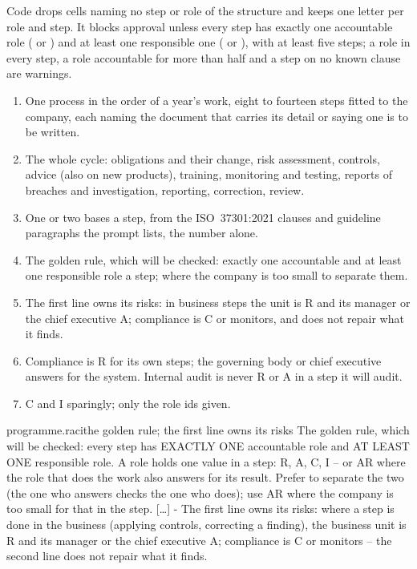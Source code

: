 Code drops cells naming no step or role of the structure and keeps one letter per role and
step. It blocks approval unless every step has exactly one accountable role ( or
) and at least one responsible one ( or ), with at least five
steps; a role in every step, a role accountable for more than half and a step on no known
clause are warnings.

\begin{enumerate}[itemsep=1pt, topsep=3pt]
  \item One process in the order of a year's work, eight to fourteen steps fitted to the
    company, each naming the document that carries its detail or saying one is to be written.
  \item The whole cycle: obligations and their change, risk assessment, controls, advice
    (also on new products), training, monitoring and testing, reports of breaches and
    investigation, reporting, correction, review.
  \item One or two bases a step, from the ISO~37301:2021 clauses and guideline paragraphs the
    prompt lists, the number alone.
  \item The golden rule, which will be checked: exactly one accountable and at least one
    responsible role a step;  where the company is too small to separate them.
  \item The first line owns its risks: in business steps the unit is R and its manager or the
    chief executive A; compliance is C or monitors, and does not repair what it finds.
  \item Compliance is R for its own steps; the governing body or chief executive answers for
    the system. Internal audit is never R or A in a step it will audit.
  \item C and I sparingly; only the role ids given.
\end{enumerate}

\par\nopagebreak
\begin{promptexcerpt}{programme.raci}{the golden rule; the first line owns its risks}
The golden rule, which will be checked: every step has EXACTLY ONE accountable role and AT LEAST ONE responsible role. A role holds one value in a step: R, A, C, I – or AR where the role that does the work also answers for its result. Prefer to separate the two (the one who answers checks the one who does); use AR where the company is too small for that in the step.
[…]
- The first line owns its risks: where a step is done in the business (applying controls, correcting a finding), the business unit is R and its manager or the chief executive A; compliance is C or monitors – the second line does not repair what it finds.
\end{promptexcerpt}

